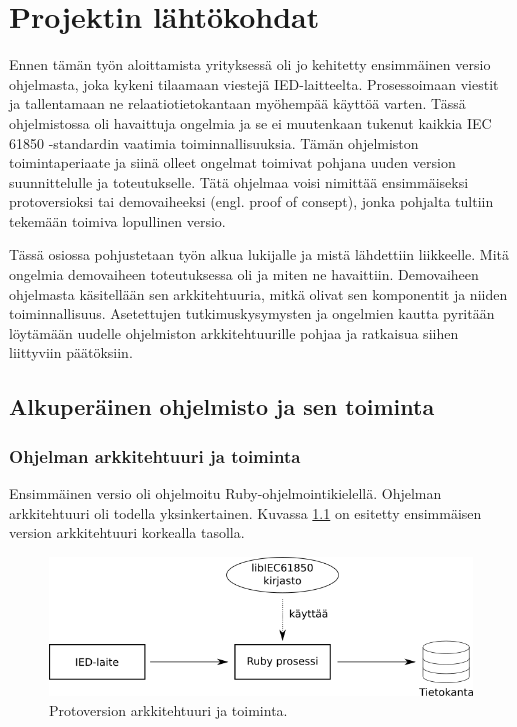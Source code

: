 \chapter{Projektin lähtökohdat}
\label{ch:projektin-lähtökohdat}
Ennen tämän työn aloittamista yrityksessä oli jo kehitetty ensimmäinen versio ohjelmasta, joka kykeni tilaamaan viestejä IED-laitteelta. Prosessoimaan viestit ja tallentamaan ne relaatiotietokantaan myöhempää käyttöä varten. Tässä ohjelmistossa oli havaittuja ongelmia ja se ei muutenkaan tukenut kaikkia IEC 61850 -standardin vaatimia toiminnallisuuksia. Tämän ohjelmiston toimintaperiaate ja siinä olleet ongelmat toimivat pohjana uuden version suunnittelulle ja toteutukselle. Tätä ohjelmaa voisi nimittää ensimmäiseksi protoversioksi tai demovaiheeksi (engl. proof of consept), jonka pohjalta tultiin tekemään toimiva lopullinen versio.

Tässä osiossa pohjustetaan työn alkua lukijalle ja mistä lähdettiin liikkeelle. Mitä ongelmia demovaiheen toteutuksessa oli ja miten ne havaittiin. Demovaiheen ohjelmasta käsitellään sen arkkitehtuuria, mitkä olivat sen komponentit ja niiden toiminnallisuus. Asetettujen tutkimuskysymysten ja ongelmien kautta pyritään löytämään uudelle ohjelmiston arkkitehtuurille pohjaa ja ratkaisua siihen liittyviin päätöksiin.


\section{Alkuperäinen ohjelmisto ja sen toiminta}


\subsection{Ohjelman arkkitehtuuri ja toiminta}
Ensimmäinen versio oli ohjelmoitu Ruby-ohjelmointikielellä. Ohjelman arkkitehtuuri oli todella yksinkertainen. Kuvassa \ref{fig:demo-architecture} on esitetty ensimmäisen version arkkitehtuuri korkealla tasolla.

\begin{figure}
	\includegraphics[width=1\textwidth]{pictures/demo-architecture.png}
	\caption{Protoversion arkkitehtuuri ja toiminta.}
	\label{fig:demo-architecture}
\end{figure}

